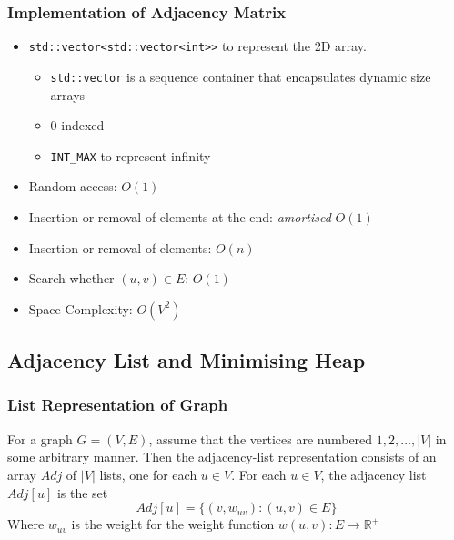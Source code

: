 \documentclass{beamer}
\begin{document}
\begin{frame}
	\frametitle{Implementation of Adjacency Matrix}
	\begin{itemize}
		\item \texttt{std::vector<std::vector<int>>} to represent the 2D array. 
		\begin{itemize}
			\item \texttt{std::vector} is a sequence container that encapsulates dynamic size arrays
			\item 0 indexed
			\item \texttt{INT\_MAX} to represent infinity
		\end{itemize}
		\item Random access: \( O(1) \) 
		\item Insertion or removal of elements at the end: \emph{amortised} \( O(1) \) 
		\item Insertion or removal of elements: \( O(n) \) 
		\item Search whether \( (u,v) \in E \): \( O(1) \) 
		\item Space Complexity: \( O(V^2) \) 
	\end{itemize}
\end{frame}

\subsection{Adjacency List and Minimising Heap}
\begin{frame}
	\frametitle{List Representation of Graph}	
	For a graph \( G = (V, E) \), assume that the vertices are numbered \( 1, 2, \hdots, \lvert{ V }\rvert  \) in some arbitrary manner. Then the adjacency-list representation consists of an array \( Adj \) of \( \lvert{ V }\rvert  \) lists, one for each \( u \in V \). For each \( u \in V\), the adjacency list \( Adj[u] \) is the set
	\[
		Adj[u] = \{ (v, w_{uv}) : (u, v) \in E\}
	\]
	Where \( w_{uv} \) is the weight for the weight function \( w(u, v) : E \rightarrow \mathbb{R}^+ \) 
\end{frame}
\end{document}
